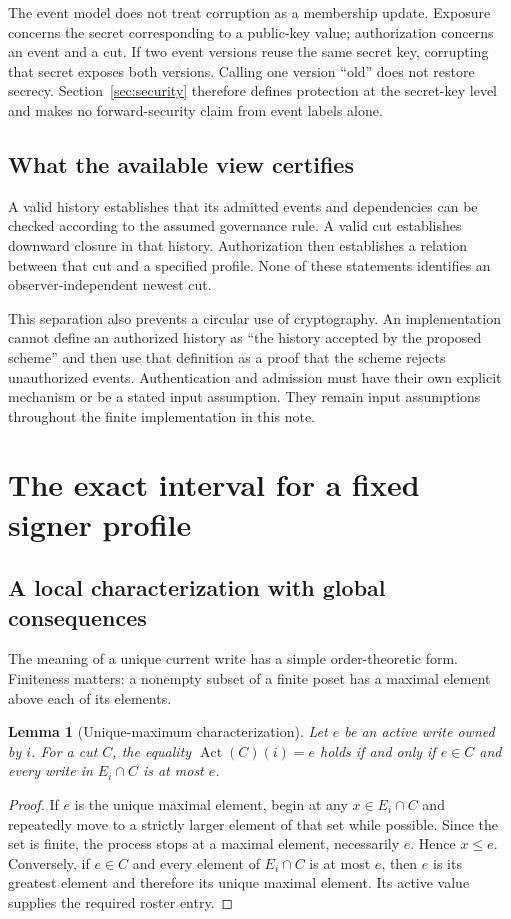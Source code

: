 \documentclass[11pt]{article}
\newtheorem{lemma}[theorem]{Lemma}
\theoremstyle{definition}
\newcommand{\Act}{\operatorname{Act}}
\begin{document}
The event model does not treat corruption as a membership update. Exposure concerns the secret corresponding to a public-key value; authorization concerns an event and a cut. If two event versions reuse the same secret key, corrupting that secret exposes both versions. Calling one version ``old'' does not restore secrecy. Section~\ref{sec:security} therefore defines protection at the secret-key level and makes no forward-security claim from event labels alone.

\subsection{What the available view certifies}
A valid history establishes that its admitted events and dependencies can be checked according to the assumed governance rule. A valid cut establishes downward closure in that history. Authorization then establishes a relation between that cut and a specified profile. None of these statements identifies an observer-independent newest cut.

This separation also prevents a circular use of cryptography. An implementation cannot define an authorized history as ``the history accepted by the proposed scheme'' and then use that definition as a proof that the scheme rejects unauthorized events. Authentication and admission must have their own explicit mechanism or be a stated input assumption. They remain input assumptions throughout the finite implementation in this note.

\section{The exact interval for a fixed signer profile}\label{sec:windows}
\subsection{A local characterization with global consequences}
The meaning of a unique current write has a simple order-theoretic form. Finiteness matters: a nonempty subset of a finite poset has a maximal element above each of its elements.

\begin{lemma}[Unique-maximum characterization]\label{lem:maximum}
Let $e$ be an active write owned by $i$. For a cut $C$, the equality $\Act(C)(i)=e$ holds if and only if $e\in C$ and every write in $E_i\cap C$ is at most $e$.
\end{lemma}
\begin{proof}
If $e$ is the unique maximal element, begin at any $x\in E_i\cap C$ and repeatedly move to a strictly larger element of that set while possible. Since the set is finite, the process stops at a maximal element, necessarily $e$. Hence $x\leq e$. Conversely, if $e\in C$ and every element of $E_i\cap C$ is at most $e$, then $e$ is its greatest element and therefore its unique maximal element. Its active value supplies the required roster entry.
\end{proof}
\end{document}
